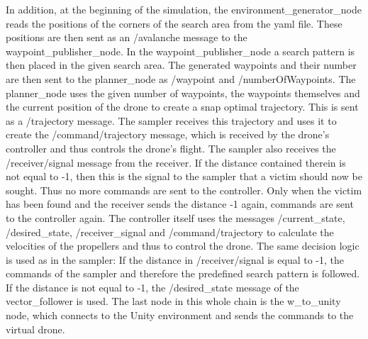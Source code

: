 \documentclass[conference]{IEEEtran}
\begin{document}
In addition, at the beginning of the simulation, the environment\_generator\_node reads the positions of the corners of the search area from the yaml file. These positions are then sent as an /avalanche message to the waypoint\_publisher\_node.
In the waypoint\_publisher\_node a search pattern is then placed in the given search area. The generated waypoints and their number are then sent to the planner\_node as /waypoint and /numberOfWaypoints.
The planner\_node uses the given number of waypoints, the waypoints themselves and the current position of the drone to create a snap optimal trajectory. This is sent as a /trajectory message.
The sampler receives this trajectory and uses it to create the /command/trajectory message, which is received by the drone's controller and thus controls the drone's flight. The sampler also receives the /receiver/signal message from the receiver. If the distance contained therein is not equal to -1, then this is the signal to the sampler that a victim should now be sought. Thus no more commands are sent to the controller. Only when the victim has been found and the receiver sends the distance -1 again, commands are sent to the controller again.
The controller itself uses the messages /current\_state, /desired\_state, /receiver\_signal and /command/trajectory to calculate the velocities of the propellers and thus to control the drone. The same decision logic is used as in the sampler: If the distance in /receiver/signal is equal to -1, the commands of the sampler and therefore the predefined search pattern is followed. If the distance is not equal to -1, the /desired\_state message of the vector\_follower is used.
The last node in this whole chain is the w\_to\_unity node, which connects to the Unity environment and sends the commands to the virtual drone.
\end{document}
